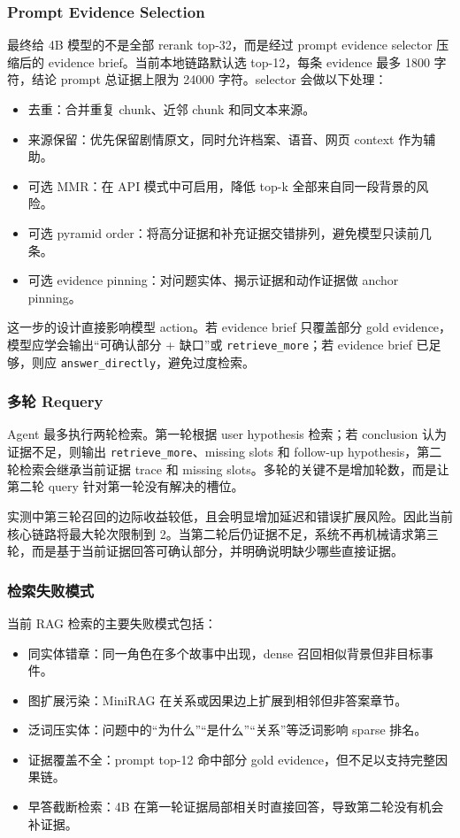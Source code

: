 \documentclass[UTF8,a4paper,12pt]{ctexart}
\newcommand{\code}[1]{\texttt{#1}}
\begin{document}
\subsubsection{Prompt Evidence Selection}

最终给 4B 模型的不是全部 rerank top-32，而是经过 prompt evidence selector 压缩后的 evidence brief。当前本地链路默认选 top-12，每条 evidence 最多 1800 字符，结论 prompt 总证据上限为 24000 字符。selector 会做以下处理：
\begin{itemize}
  \item 去重：合并重复 chunk、近邻 chunk 和同文本来源。
  \item 来源保留：优先保留剧情原文，同时允许档案、语音、网页 context 作为辅助。
  \item 可选 MMR：在 API 模式中可启用，降低 top-k 全部来自同一段背景的风险。
  \item 可选 pyramid order：将高分证据和补充证据交错排列，避免模型只读前几条。
  \item 可选 evidence pinning：对问题实体、揭示证据和动作证据做 anchor pinning。
\end{itemize}

这一步的设计直接影响模型 action。若 evidence brief 只覆盖部分 gold evidence，模型应学会输出“可确认部分 + 缺口”或 \code{retrieve\_more}；若 evidence brief 已足够，则应 \code{answer\_directly}，避免过度检索。

\subsubsection{多轮 Requery}

Agent 最多执行两轮检索。第一轮根据 user hypothesis 检索；若 conclusion 认为证据不足，则输出 \code{retrieve\_more}、missing slots 和 follow-up hypothesis，第二轮检索会继承当前证据 trace 和 missing slots。多轮的关键不是增加轮数，而是让第二轮 query 针对第一轮没有解决的槽位。

实测中第三轮召回的边际收益较低，且会明显增加延迟和错误扩展风险。因此当前核心链路将最大轮次限制到 2。当第二轮后仍证据不足，系统不再机械请求第三轮，而是基于当前证据回答可确认部分，并明确说明缺少哪些直接证据。

\subsubsection{检索失败模式}

当前 RAG 检索的主要失败模式包括：
\begin{itemize}
  \item 同实体错章：同一角色在多个故事中出现，dense 召回相似背景但非目标事件。
  \item 图扩展污染：MiniRAG 在关系或因果边上扩展到相邻但非答案章节。
  \item 泛词压实体：问题中的“为什么”“是什么”“关系”等泛词影响 sparse 排名。
  \item 证据覆盖不全：prompt top-12 命中部分 gold evidence，但不足以支持完整因果链。
  \item 早答截断检索：4B 在第一轮证据局部相关时直接回答，导致第二轮没有机会补证据。
\end{itemize}
\end{document}
